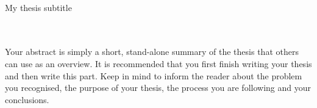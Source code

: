 \begin{center}
    \LARGE
     \\
     \vspace{0.5cm}
    My thesis subtitle \\
    \vspace{0.4cm}
     \\
    \vspace{1.5cm}
\\
\vspace{25mm}
\end{center}
\centering
Your abstract is simply a short, stand-alone summary of the thesis that others can use as an overview. It is recommended that you first finish writing your thesis and then write this part. Keep in mind to inform the reader about the problem you recognised, the purpose of your thesis, the process you are following and your conclusions.
\vfill